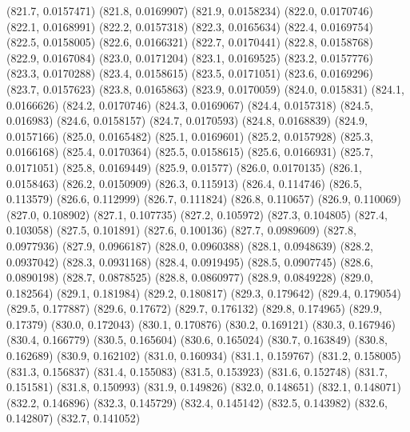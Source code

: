 {					(821.7, 0.0157471)
					(821.8, 0.0169907)
					(821.9, 0.0158234)
					(822.0, 0.0170746)
					(822.1, 0.0168991)
					(822.2, 0.0157318)
					(822.3, 0.0165634)
					(822.4, 0.0169754)
					(822.5, 0.0158005)
					(822.6, 0.0166321)
					(822.7, 0.0170441)
					(822.8, 0.0158768)
					(822.9, 0.0167084)
					(823.0, 0.0171204)
					(823.1, 0.0169525)
					(823.2, 0.0157776)
					(823.3, 0.0170288)
					(823.4, 0.0158615)
					(823.5, 0.0171051)
					(823.6, 0.0169296)
					(823.7, 0.0157623)
					(823.8, 0.0165863)
					(823.9, 0.0170059)
					(824.0, 0.015831)
					(824.1, 0.0166626)
					(824.2, 0.0170746)
					(824.3, 0.0169067)
					(824.4, 0.0157318)
					(824.5, 0.016983)
					(824.6, 0.0158157)
					(824.7, 0.0170593)
					(824.8, 0.0168839)
					(824.9, 0.0157166)
					(825.0, 0.0165482)
					(825.1, 0.0169601)
					(825.2, 0.0157928)
					(825.3, 0.0166168)
					(825.4, 0.0170364)
					(825.5, 0.0158615)
					(825.6, 0.0166931)
					(825.7, 0.0171051)
					(825.8, 0.0169449)
					(825.9, 0.01577)
					(826.0, 0.0170135)
					(826.1, 0.0158463)
					(826.2, 0.0150909)
					(826.3, 0.115913)
					(826.4, 0.114746)
					(826.5, 0.113579)
					(826.6, 0.112999)
					(826.7, 0.111824)
					(826.8, 0.110657)
					(826.9, 0.110069)
					(827.0, 0.108902)
					(827.1, 0.107735)
					(827.2, 0.105972)
					(827.3, 0.104805)
					(827.4, 0.103058)
					(827.5, 0.101891)
					(827.6, 0.100136)
					(827.7, 0.0989609)
					(827.8, 0.0977936)
					(827.9, 0.0966187)
					(828.0, 0.0960388)
					(828.1, 0.0948639)
					(828.2, 0.0937042)
					(828.3, 0.0931168)
					(828.4, 0.0919495)
					(828.5, 0.0907745)
					(828.6, 0.0890198)
					(828.7, 0.0878525)
					(828.8, 0.0860977)
					(828.9, 0.0849228)
					(829.0, 0.182564)
					(829.1, 0.181984)
					(829.2, 0.180817)
					(829.3, 0.179642)
					(829.4, 0.179054)
					(829.5, 0.177887)
					(829.6, 0.17672)
					(829.7, 0.176132)
					(829.8, 0.174965)
					(829.9, 0.17379)
					(830.0, 0.172043)
					(830.1, 0.170876)
					(830.2, 0.169121)
					(830.3, 0.167946)
					(830.4, 0.166779)
					(830.5, 0.165604)
					(830.6, 0.165024)
					(830.7, 0.163849)
					(830.8, 0.162689)
					(830.9, 0.162102)
					(831.0, 0.160934)
					(831.1, 0.159767)
					(831.2, 0.158005)
					(831.3, 0.156837)
					(831.4, 0.155083)
					(831.5, 0.153923)
					(831.6, 0.152748)
					(831.7, 0.151581)
					(831.8, 0.150993)
					(831.9, 0.149826)
					(832.0, 0.148651)
					(832.1, 0.148071)
					(832.2, 0.146896)
					(832.3, 0.145729)
					(832.4, 0.145142)
					(832.5, 0.143982)
					(832.6, 0.142807)
					(832.7, 0.141052)
}
